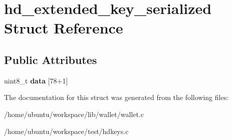\hypertarget{structhd__extended__key__serialized}{\section{hd\-\_\-extended\-\_\-key\-\_\-serialized Struct Reference}
\label{structhd__extended__key__serialized}
}
\subsection*{Public Attributes}
\begin{DoxyCompactItemize}
\item 
\hypertarget{structhd__extended__key__serialized_a4e876540d3db5d2e5e76df1de4a06b48}{uint8\-\_\-t {\bfseries data} \mbox{[}78+1\mbox{]}}\label{structhd__extended__key__serialized_a4e876540d3db5d2e5e76df1de4a06b48}

\end{DoxyCompactItemize}


The documentation for this struct was generated from the following files\-:\begin{DoxyCompactItemize}
\item 
/home/ubuntu/workspace/lib/wallet/wallet.\-c\item 
/home/ubuntu/workspace/test/hdkeys.\-c\end{DoxyCompactItemize}
